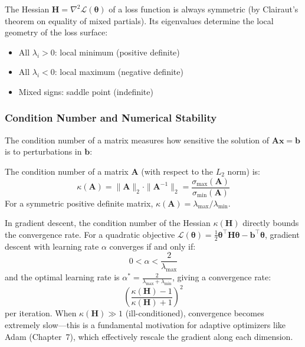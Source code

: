 The Hessian $\mathbf{H} = \nabla^2 \mathcal{L}(\boldsymbol{\theta})$ of a loss function is always symmetric (by Clairaut's theorem on equality of mixed partials). Its eigenvalues determine the local geometry of the loss surface:
\begin{itemize}
    \item All $\lambda_i > 0$: local minimum (positive definite)
    \item All $\lambda_i < 0$: local maximum (negative definite)
    \item Mixed signs: saddle point (indefinite)
\end{itemize}

\subsubsection{Condition Number and Numerical Stability}

The condition number of a matrix measures how sensitive the solution of $\mathbf{A}\mathbf{x} = \mathbf{b}$ is to perturbations in $\mathbf{b}$:

\begin{definition}
The condition number of a matrix $\mathbf{A}$ (with respect to the $L_2$ norm) is:
\begin{equation}
\kappa(\mathbf{A}) = \|\mathbf{A}\|_2 \cdot \|\mathbf{A}^{-1}\|_2 = \frac{\sigma_{\max}(\mathbf{A})}{\sigma_{\min}(\mathbf{A})}
\end{equation}
For a symmetric positive definite matrix, $\kappa(\mathbf{A}) = \lambda_{\max} / \lambda_{\min}$.
\end{definition}

In gradient descent, the condition number of the Hessian $\kappa(\mathbf{H})$ directly bounds the convergence rate. For a quadratic objective $\mathcal{L}(\boldsymbol{\theta}) = \frac{1}{2}\boldsymbol{\theta}^\top \mathbf{H}\boldsymbol{\theta} - \mathbf{b}^\top\boldsymbol{\theta}$, gradient descent with learning rate $\alpha$ converges if and only if:
\begin{equation}
0 < \alpha < \frac{2}{\lambda_{\max}}
\end{equation}
and the optimal learning rate is $\alpha^* = \frac{2}{\lambda_{\max} + \lambda_{\min}}$, giving a convergence rate:
\begin{equation}
\left(\frac{\kappa(\mathbf{H}) - 1}{\kappa(\mathbf{H}) + 1}\right)^2
\end{equation}
per iteration. When $\kappa(\mathbf{H}) \gg 1$ (ill-conditioned), convergence becomes extremely slow---this is a fundamental motivation for adaptive optimizers like Adam (Chapter~7), which effectively rescale the gradient along each dimension.

